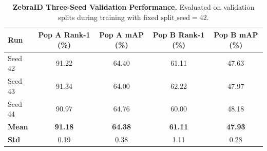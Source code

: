 \begin{table}[h]
\centering
\small
\caption{\textbf{ZebraID Three-Seed Validation Performance.} Evaluated on validation splits during training with fixed $\text{split\_seed}=42$.}
\label{tab:zebraid_three_seed_val}
\begin{tabular}{lcccc}
\toprule
\textbf{Run} & \textbf{Pop A Rank-1 (\%)} & \textbf{Pop A mAP (\%)} & \textbf{Pop B Rank-1 (\%)} & \textbf{Pop B mAP (\%)} \\
\midrule
Seed 42 & 91.22 & 64.40 & 61.11 & 47.63 \\
Seed 43 & 91.34 & 64.00 & 62.22 & 47.97 \\
Seed 44 & 90.97 & 64.76 & 60.00 & 48.18 \\
\midrule
\textbf{Mean} & \textbf{91.18} & \textbf{64.38} & \textbf{61.11} & \textbf{47.93} \\
\textbf{Std}  & 0.19 & 0.38 & 1.11 & 0.28 \\
\bottomrule
\end{tabular}
\end{table}
